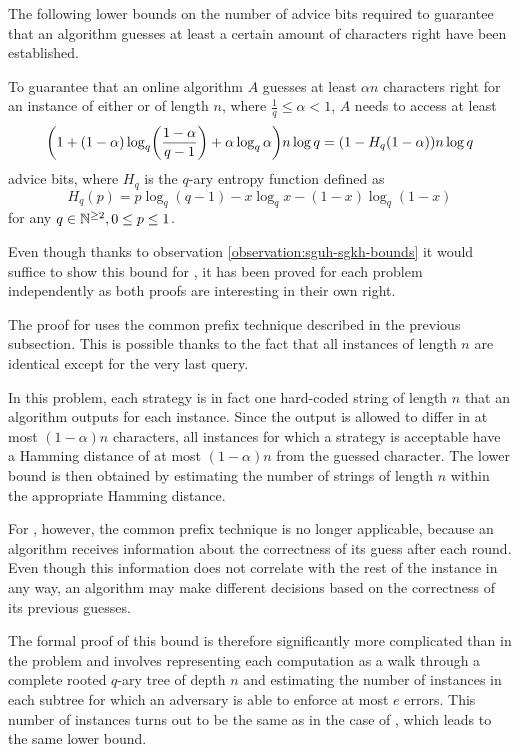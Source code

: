 The following lower bounds on the number of advice bits required to
guarantee that an algorithm guesses at least a certain amount of
characters right have been established.

\begin{theorem}\label{theorem:sguh-lower-ratio}\label{theorem:sgkh-lower-ratio}
    To guarantee that an online algorithm $A$ guesses at least $\alpha{}n$
    characters right for an instance of either  or  of
    length $n$, where $\frac{1}{q} \leq \alpha < 1$, $A$ needs to access at
    least
    $$
        \paren*{1 + (1 - \alpha)\log_q\paren*{\frac{1 - \alpha}{q - 1}} +
        \alpha\log_q\alpha} n\lg{}q
        =
        (1 - H_q (1 - \alpha)) n\lg{}q
    $$
    advice bits, where $H_q$ is the $q$-ary entropy function defined as
    $$
        H_q(p) = p \log_q(q - 1) - x\log_qx - (1-x)\log_q(1-x)
    $$
    for any $q \in \mathbb{N}^{\geq2}, 0 \leq p \leq 1$.
\end{theorem}

Even though thanks to observation \ref{observation:sguh-sgkh-bounds} it
would suffice to show this bound for , it has been proved for each
problem independently as both proofs are interesting in their own right.

The proof for  uses the common prefix technique described in the
previous subsection. This is possible thanks to the fact that all
instances of length $n$ are identical except for the very last query.

In this problem, each strategy is in fact one hard-coded string of length
$n$ that an algorithm outputs for each instance. Since the output is
allowed to differ in at most $(1-\alpha)n$ characters, all instances for
which a strategy is acceptable have a Hamming distance of at most
$(1-\alpha)n$ from the guessed character. The lower bound is then obtained
by estimating the number of strings of length $n$ within the appropriate
Hamming distance.

For , however, the common prefix technique is no longer
applicable, because an algorithm receives information about the
correctness of its guess after each round. Even though this information
does not correlate with the rest of the instance in any way, an algorithm
may make different decisions based on the correctness of its previous
guesses.

The formal proof of this bound is therefore significantly more complicated
than in the  problem and involves representing each computation as
a walk through a complete rooted $q$-ary tree of depth $n$ and estimating
the number of instances in each subtree for which an adversary is able to
enforce at most $e$ errors. This number of instances turns out to be the
same as in the case of , which leads to the same lower bound.


